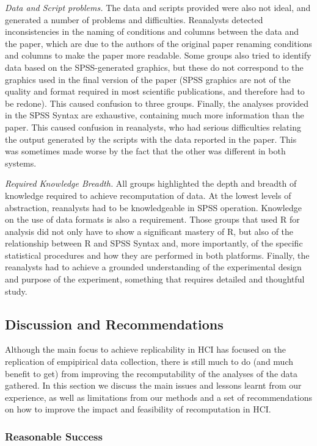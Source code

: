 \emph{Data and Script problems.} The data and scripts provided were also not ideal, and generated a number of problems and difficulties. Reanalysts detected inconsistencies in the naming of conditions and columns between the data and the paper, which are due to the authors of the original paper renaming conditions and columns to make the paper more readable. Some groups also tried to identify data based on the SPSS-generated graphics, but these do not correspond to the graphics used in the final version of the paper (SPSS graphics are not of the quality and format required in most scientific publications, and therefore had to be redone). This caused confusion to three groups. Finally, the analyses provided in the SPSS Syntax are exhaustive, containing much more information than the paper. This caused confusion in reanalysts, who had serious difficulties relating the output generated by the scripts with the data reported in the paper. This was sometimes made worse by the fact that the other was different in both systems.

\emph{Required Knowledge Breadth.} All groups highlighted the depth and breadth of knowledge required to achieve recomputation of data. At the lowest levels of abstraction, reanalysts had to be knowledgeable in SPSS operation. Knowledge on the use of data formats is also a requirement. Those groups that used R for analysis did not only have to show a significant mastery of R, but also of the relationship between R and SPSS Syntax and, more importantly, of the specific statistical procedures and how they are performed in both platforms. Finally, the reanalysts had to achieve a grounded understanding of the experimental design and purpose of the experiment, something that requires detailed and thoughtful study.

\subsection{Discussion and Recommendations}
Although the main focus to achieve replicability in HCI has focused on the replication of empipirical data collection, there is still much to do (and much benefit to get) from improving the recomputability of the analyses of the data gathered. In this section we discuss the main issues and lessons learnt from our experience, as well as limitations from our methods and a set of recommendations on how to improve the impact and feasibility of recomputation in HCI.

\subsubsection{Reasonable Success}

